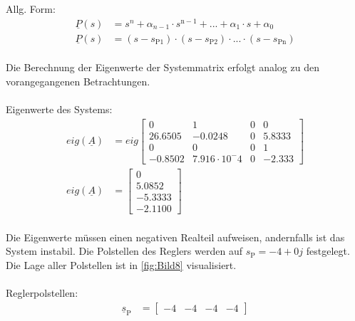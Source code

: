 \documentclass[
	pagesize,
	fontsize=12pt,
	paper=a4,
	oneside,
   reqno
]{scrartcl}
\begin{document}
Allg. Form:
\begin{align*}
        \underline{P}(s) &= s^n+\alpha_{n-1}\cdot s^{\mathrm{n-1}}+...+\alpha_{\mathrm{1}}\cdot s + \alpha_{\mathrm{0}} \\
        \underline{P}(s) &= (s-s_{\mathrm{P1}})\cdot(s-s_{\mathrm{P2}})\cdot ... \cdot (s-s_{\mathrm{Pn}})
\end{align*}\\
Die Berechnung der Eigenwerte der Systemmatrix erfolgt analog zu den vorangegangenen Betrachtungen.\\\\
Eigenwerte des Systems:
\begin{align}\label{eq:Gleichung36}
    eig(\underline{A}) &= eig
    \begin{bmatrix}
        0 & 1 & 0 & 0 \\
        26.6505 & -0.0248 & 0 & 5.8333 \\
        0 & 0 & 0 & 1 \\
        -0.8502 & 7.916\cdot10^-4 & 0 & -2.333
    \end{bmatrix} \nonumber\\
    eig(\underline{A}) &=
    \begin{bmatrix}
        0 \\
        5.0852 \\
        -5.3333 \\
        -2.1100
    \end{bmatrix}
\end{align}\\
Die Eigenwerte müssen einen negativen Realteil aufweisen, andernfalls ist das System instabil. Die Polstellen des Reglers werden auf $s_{\mathrm{P}} = -4+0j$ festgelegt. Die Lage aller Polstellen ist in \autoref{fig:Bild8} visualisiert.\\\\
Reglerpolstellen:
\begin{align}\label{eq:Gleichung37}
    \underline{s}_{\mathrm{P}} &= 
    \begin{bmatrix}
        -4 & -4 & -4 & -4 
    \end{bmatrix}
\end{align}
\end{document}
